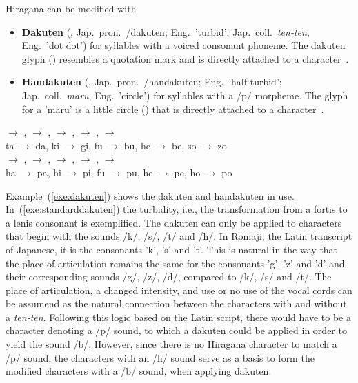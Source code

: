 Hiragana can be modified with
\begin{itemize}

  \item \textbf{Dakuten} (, Jap.\ pron.\ /dakuten;
        Eng.\ 'turbid'; Jap.\ coll.\ \emph{ten-ten}, Eng.\ 'dot dot') for 
        syllables with a voiced consonant phoneme. The dakuten glyph ()  
        resembles a quotation mark and is directly attached to a 
        character~.

  \item \textbf{Handakuten} (,
        Jap.\ pron.\ /handakuten; 
        Eng.\ 'half-turbid'; Jap.\ coll.\ \emph{maru}, Eng.\ 'circle') for syllables 
        with a /p/ morpheme. The glyph for a 'maru' is a little circle ()
        that is directly attached to a character~.

\end{itemize}
\begin{exe}
\ex \label{exe:dakuten}
\begin{xlist}
\ex \label{exe:standarddakuten}
\gll {} $\rightarrow$ ,  $\rightarrow$ ,  $\rightarrow$ ,  $\rightarrow$ ,  $\rightarrow$  \\
ta $\rightarrow$ da, ki $\rightarrow$ gi, fu $\rightarrow$ bu, he $\rightarrow$ be, so $\rightarrow$ zo \\

\ex \label{exe:handakuten}
\gll {} $\rightarrow$ ,  $\rightarrow$ ,  $\rightarrow$ ,  $\rightarrow$ ,  $\rightarrow$  \\
ha $\rightarrow$ pa, hi $\rightarrow$ pi, fu $\rightarrow$ pu, he $\rightarrow$ pe, ho $\rightarrow$ po \\
\end{xlist}
\end{exe}
Example~(\ref{exe:dakuten}) shows the dakuten and handakuten in use. 
In~(\ref{exe:standarddakuten}) the turbidity, i.e., the transformation from a 
fortis to a lenis consonant is exemplified. 
The dakuten can only be applied to characters that begin with the sounds 
/k/, /s/, /t/ and /h/. In Romaji, the Latin transcript of Japanese, it is
the consonants 'k', 's' and 't'. This is natural in the
way that the place of articulation remains the same for the consonants 'g', 'z' 
and 'd' and their corresponding sounds /g/, /z/, /d/, 
compared to /k/, /s/ and /t/.
The place of articulation, a changed intensity, and use or no use of the vocal 
cords can be assumend as the natural connection between the characters with and 
without a \emph{ten-ten}. 
Following this logic based on the Latin script, 
there would have to be a character denoting a /p/ sound,
to which a dakuten could be applied in order to yield the sound /b/.
However, since there is no Hiragana character to match a /p/ sound,
the characters with an /h/ sound serve as a basis to form the modified 
characters with a /b/ sound, when applying dakuten.

